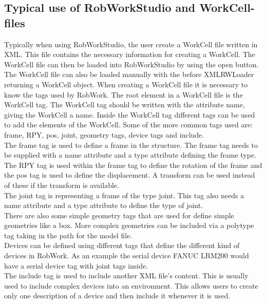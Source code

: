 \subsection{Typical use of RobWorkStudio and WorkCell-files}
Typically when using RobWorkStudio, the user create a WorkCell file written in XML. This file contains the necessary information for creating a WorkCell. The WorkCell file can then be loaded into RobWorkStudio by using the open button. The WorkCell file can also be loaded manually with the before XMLRWLoader returning a WorkCell object. When creating a WorkCell file it is necessary to know the tags used by RobWork. The root element in a WorkCell file is the WorkCell tag. The WorkCell tag should be written with the attribute name, giving the WorkCell a name. Inside the WorkCell tag different tags can be used to add the elements of the WorkCell. Some of the more common tags used are: frame, RPY, pos, joint, geometry tags, device tags and include.\\
The frame tag is used to define a frame in the structure. The frame tag needs to be supplied with a name attribute and a type attribute defining the frame type.\\
The RPY tag is used within the frame tag to define the rotation of the frame and the pos tag is used to define the displacement. A transform can be used instead of these if the transform is available.\\
The joint tag is representing a frame of the type joint. This tag also needs a name attribute and a type attribute to define the type of joint.\\
There are also some simple geometry tags that are used for define simple geometries like a box. More complex geometries can be included via a polytype tag taking in the path for the model file.\\
Devices can be defined using different tags that define the different kind of devices in RobWork. As an example the serial device FANUC LRM200 would have a serial device tag with joint tags inside.\\
The include tag is used to include another XML file's content. This is usually used to include complex devices into an environment. This allows users to create only one description of a device and then include it whenever it is used.

